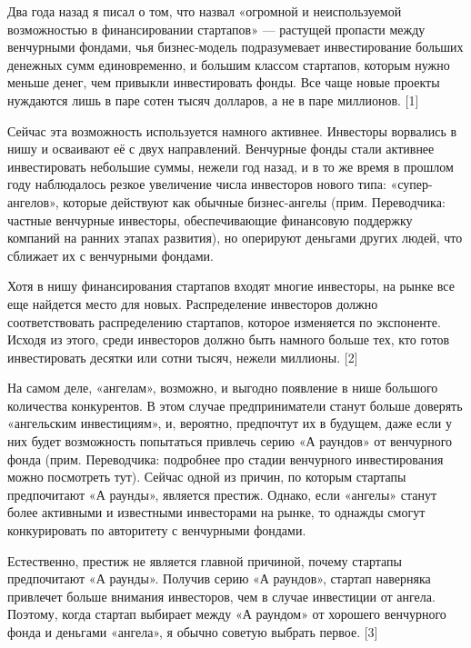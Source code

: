 \documentclass[ebook,12pt,oneside,openany]{memoir}
\begin{document}
\maketitle

Два года назад я писал о том, что назвал «огромной и неиспользуемой
возможностью в финансировании стартапов» — растущей пропасти между
венчурными фондами, чья бизнес-модель подразумевает инвестирование
больших денежных сумм единовременно, и большим классом стартапов,
которым нужно меньше денег, чем привыкли инвестировать фонды. Все чаще
новые проекты нуждаются лишь в паре сотен тысяч долларов, а не в паре
миллионов. [1]

Сейчас эта возможность используется намного активнее. Инвесторы
ворвались в нишу и осваивают её с двух направлений. Венчурные фонды
стали активнее инвестировать небольшие суммы, нежели год назад, и в то
же время в прошлом году наблюдалось резкое увеличение числа инвесторов
нового типа: «супер-ангелов», которые действуют как обычные
бизнес-ангелы (прим. Переводчика: частные венчурные инвесторы,
обеспечивающие финансовую поддержку компаний на ранних этапах
развития), но оперируют деньгами других людей, что сближает их с
венчурными фондами.

Хотя в нишу финансирования стартапов входят многие инвесторы, на рынке
все еще найдется место для новых. Распределение инвесторов должно
соответствовать распределению стартапов, которое изменяется по
экспоненте. Исходя из этого, среди инвесторов должно быть намного
больше тех, кто готов инвестировать десятки или сотни тысяч, нежели
миллионы. [2]

На самом деле, «ангелам», возможно, и выгодно появление в нише
большого количества конкурентов. В этом случае предприниматели станут
больше доверять «ангельским инвестициям», и, вероятно, предпочтут их в
будущем, даже если у них будет возможность попытаться привлечь серию
«А раундов» от венчурного фонда (прим. Переводчика: подробнее про
стадии венчурного инвестирования можно посмотреть тут). Сейчас одной
из причин, по которым стартапы предпочитают «А раунды», является
престиж. Однако, если «ангелы» станут более активными и известными
инвесторами на рынке, то однажды смогут конкурировать по авторитету с
венчурными фондами.

Естественно, престиж не является главной причиной, почему стартапы
предпочитают «А раунды». Получив серию «А раундов», стартап наверняка
привлечет больше внимания инвесторов, чем в случае инвестиции от
ангела. Поэтому, когда стартап выбирает между «А раундом» от хорошего
венчурного фонда и деньгами «ангела», я обычно советую выбрать первое.
[3]
\end{document}
